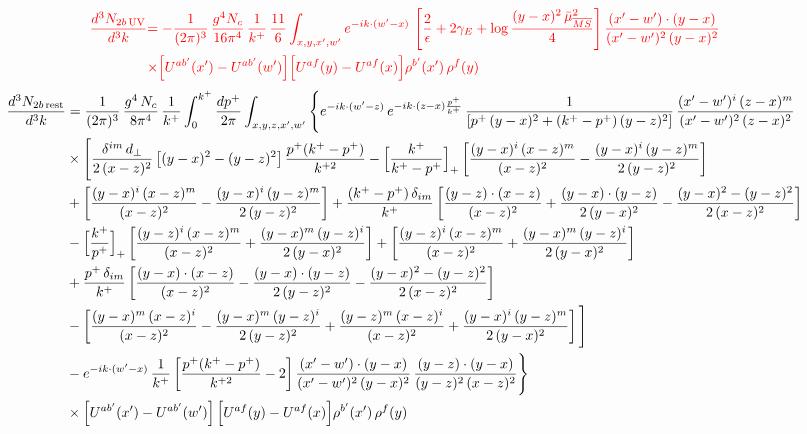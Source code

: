 \documentclass[9pt]{article}
\numberwithin{equation}{section}
\newcommand{\chg}[1]{{\color{red}#1}}
\begin{document}
\begin{align}
\chg{\frac{d^{3}N_{2b\,\rm UV}}{d^{3}k}}&\chg{=-\frac{1}{(2\pi)^{3}}\,\frac{g^{4}N_{c}}{16\pi^{4}}\,\frac{1}{k^{+}}\,\frac{11}{6}\int_{x,y,x',w'}e^{-ik\cdot(w'-x)}\,\left[\frac{2}{\epsilon}+2\gamma_{E}+\log\frac{(y-x)^{2}\,\bar\mu^{2}_{\overline{MS}}}{4}\right]\frac{(x'-w')\cdot(y-x)}{(x'-w')^{2}\,(y-x)^{2}}}\notag \\ & \chg{\times\Big[U^{ab'}(x')-U^{ab'}(w')\Big]\Big[U^{af}(y)-U^{af}(x)\Big]\rho^{b'}(x')\,\rho^{f}(y)}
\end{align}
\begin{align}
\frac{d^{3}N_{2b\,\rm rest}}{d^{3}k} & =\frac{1}{(2\pi)^{3}}\,\frac{g^{4}\,N_{c}}{8\pi^{4}}\,\frac{1}{k^{+}}\int_{0}^{k^{+}}\frac{dp^{+}}{2\pi}\int_{x,y,z,x',w'}\Bigg\{e^{-ik\cdot(w'-z)}\,e^{-ik\cdot(z-x)\frac{p^{+}}{k^{+}}}\,\frac{1}{\left[p^{+}\,(y-x)^{2}+(k^{+}-p^{+})\,(y-z)^{2}\right]}\,\frac{(x'-w')^{i}\,(z-x)^{m}}{(x'-w')^{2}\,(z-x)^{2}}\notag\\
&\times\Bigg[\frac{\delta^{im}\,d_{\perp}}{2\,(x-z)^{2}}\left[(y-x)^{2}-(y-z)^{2}\right]\frac{p^{+}(k^{+}-p^{+})}{k^{+2}}
-\Big[\frac{k^{+}}{k^{+}-p^{+}}\Big]_{+}\left[\frac{(y-x)^{i}\,(x-z)^{m}}{(x-z)^{2}}-\frac{(y-x)^{i}\,(y-z)^{m}}{2\,(y-z)^{2}}\right]\notag\\
&+\left[\frac{(y-x)^{i}\,(x-z)^{m}}{(x-z)^{2}}-\frac{(y-x)^{i}\,(y-z)^{m}}{2\,(y-z)^{2}}\right]
+\frac{(k^{+}-p^{+})\,\delta_{im}}{k^{+}}\left[\frac{(y-z)\cdot(x-z)}{(x-z)^{2}}+\frac{(y-x)\cdot(y-z)}{2\,(y-x)^{2}}-\frac{(y-x)^{2}-(y-z)^{2}}{2\,(x-z)^{2}}\right]\notag\\
&-\Big[\frac{k^{+}}{p^{+}}\Big]_{+}\left[\frac{(y-z)^{i}\,(x-z)^{m}}{(x-z)^{2}}+\frac{(y-x)^{m}\,(y-z)^{i}}{2\,(y-x)^{2}}\right]+\left[\frac{(y-z)^{i}\,(x-z)^{m}}{(x-z)^{2}}+\frac{(y-x)^{m}\,(y-z)^{i}}{2\,(y-x)^{2}}\right]\notag\\
&+\frac{p^{+}\,\delta_{im}}{k^{+}}\left[\frac{(y-x)\cdot(x-z)}{(x-z)^{2}}-\frac{(y-x)\cdot(y-z)}{2\,(y-z)^{2}}-\frac{(y-x)^{2}-(y-z)^{2}}{2\,(x-z)^{2}}\right]\notag\\
&-\left[\frac{(y-x)^{m}\,(x-z)^{i}}{(x-z)^{2}}-\frac{(y-x)^{m}\,(y-z)^{i}}{2\,(y-z)^{2}}+\frac{(y-z)^{m}\,(x-z)^{i}}{(x-z)^{2}}+\frac{(y-x)^{i}\,(y-z)^{m}}{2\,(y-x)^{2}}\right]\Bigg]\notag\\
&-e^{-ik\cdot(w'-x)}\,\frac{1}{k^{+}}\left[\frac{p^{+}(k^{+}-p^{+})}{k^{+2}}-2\right]\frac{(x'-w')\cdot(y-x)}{(x'-w')^{2}\,(y-x)^{2}}\,\frac{(y-z)\cdot(y-x)}{(y-z)^{2}\,(x-z)^{2}}\Bigg\}\notag\\
&\times\Big[U^{ab'}(x')-U^{ab'}(w')\Big]\,\Big[U^{af}(y)-U^{af}(x)\Big]\rho^{b'}(x')\,\rho^{f}(y)
\end{align}
\end{document}

